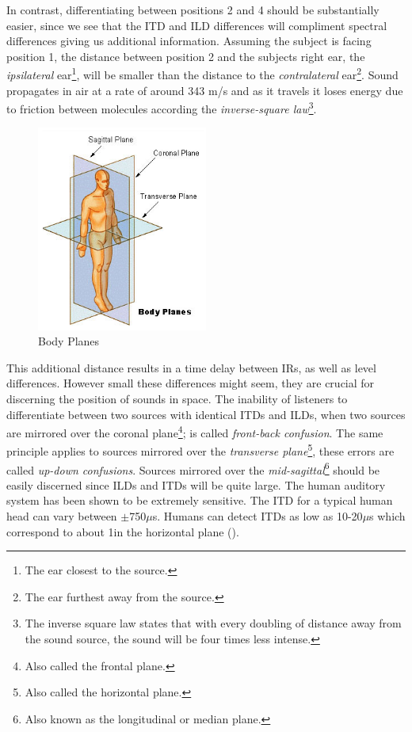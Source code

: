 In contrast, differentiating between positions 2 and 4 should be substantially easier, since we see that the ITD and ILD differences will compliment spectral differences giving us additional information. Assuming the subject is facing position 1, the distance between position 2 and the subjects right ear, the \textit{ipsilateral} ear\footnote{The ear closest to the source.}, will be smaller than the distance to the \textit{contralateral} ear\footnote{The ear furthest away from the source.}. Sound propagates in air at a rate of around 343 m/s and as it travels it loses energy due to friction between molecules according the \textit{inverse-square law}\footnote{The inverse square law states that with every doubling of distance away from the sound source, the sound will be four times less intense.}. 

\begin{figure}[ht!]%
\centering
\includegraphics[width=0.5\textwidth]{img/body-planes.jpg}
\caption{Body Planes \cite{body_planes_pic}}
\label{fig:body-planes}
\end{figure}

This additional distance results in a time delay between IRs, as well as level differences. However small these differences might seem, they are crucial for discerning the position of sounds in space. The inability of listeners to differentiate between two sources with identical ITDs and ILDs, when two sources are mirrored over the coronal plane\footnote{Also called the frontal plane.}; is called \textit{front-back confusion}. The same principle applies to sources mirrored over the \textit{transverse plane}\footnote{Also called the horizontal plane.}, these errors are called \textit{up-down confusions}. Sources mirrored over the \textit{mid-sagittal}\footnote{Also known as the longitudinal or median plane.} should be easily discerned since ILDs and ITDs will be quite large. The human auditory system has been shown to be extremely sensitive. The ITD for a typical human head can vary between $\pm$750$\mu$s. Humans can detect ITDs as low as 10-20$\mu$s which correspond to about 1\textdegree in the horizontal plane (\cite{hacihabiboglu2017perceptual}). 

